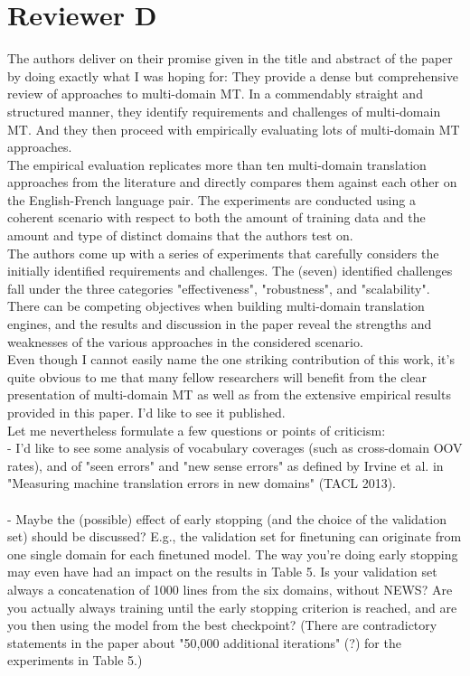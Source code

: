 \documentclass[12pt,times,a4paper,twoside]{article}
\newcommand{\fyTodo}[1]{\Todo[FY:]{\textcolor{orange}{#1}}}
\theoremstyle{definition}
\begin{document}
\section*{Reviewer D}
The authors deliver on their promise given in the title and abstract of the paper by doing exactly what I was hoping for: They provide a dense but comprehensive review of approaches to multi-domain MT. In a commendably straight and structured manner, they identify requirements and challenges of multi-domain MT. And they then proceed with empirically evaluating lots of multi-domain MT approaches.
\\
The empirical evaluation replicates more than ten multi-domain translation approaches from the literature and directly compares them against each other on the English-French language pair. The experiments are conducted using a coherent scenario with respect to both the amount of training data and the amount and type of distinct domains that the authors test on.
\\
The authors come up with a series of experiments that carefully considers the initially identified requirements and challenges. The (seven) identified challenges fall under the three categories "effectiveness", "robustness", and "scalability". There can be competing objectives when building multi-domain translation engines, and the results and discussion in the paper reveal the strengths and weaknesses of the various approaches in the considered scenario.
\\
Even though I cannot easily name the one striking contribution of this work, it's quite obvious to me that many fellow researchers will benefit from the clear presentation of multi-domain MT as well as from the extensive empirical results provided in this paper. I'd like to see it published.
\\
Let me nevertheless formulate a few questions or points of criticism:
\\
- I'd like to see some analysis of vocabulary coverages (such as
cross-domain OOV rates), and of "seen errors" and "new sense errors" as defined by Irvine et al. in "Measuring machine translation errors in new domains" (TACL 2013).
\\
\fyTodo{extra experiments to do.}
\\
- Maybe the (possible) effect of early stopping (and the choice of the validation set) should be discussed? E.g., the validation set for
finetuning can originate from one single domain for each finetuned model. The way you're doing early stopping may even have had an impact on the results in Table 5. Is your validation set always a concatenation of 1000 lines from the six domains, without NEWS? Are you actually always training until the early stopping criterion is reached, and are you then using the model from the best checkpoint? (There are contradictory statements in the paper about "50,000  additional iterations" (?) for the experiments in Table 5.)
\end{document}
